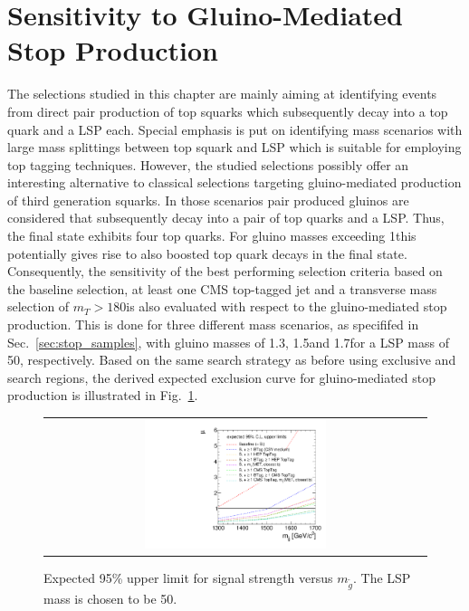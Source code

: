 \section{Sensitivity to Gluino-Mediated Stop Production}
\label{sec:stop_gluinos}
The selections studied in this chapter are mainly aiming at identifying events from direct pair production of top squarks which subsequently decay into a top quark and a LSP each. Special emphasis is put on identifying mass scenarios with large mass splittings between top squark and LSP which is suitable for employing top tagging techniques. However, the studied selections possibly offer an interesting alternative to classical selections targeting gluino-mediated production of third generation squarks. In those scenarios pair produced gluinos are considered that subsequently decay into a pair of top quarks and a LSP. Thus, the final state exhibits four top quarks. For gluino masses exceeding 1\tev this potentially gives rise to also boosted top quark decays in the final state. Consequently, the sensitivity of the best performing selection criteria based on the baseline selection, at least one CMS top-tagged jet and a transverse mass selection of $m_T > 180$\gev is also evaluated with respect to the gluino-mediated stop production. This is done for three different mass scenarios, as specififed in Sec.~\ref{sec:stop_samples}, with gluino masses of 1.3\tev, 1.5\tev and 1.7\tev for a LSP mass of 50\gev, respectively. Based on the same search strategy as before using exclusive \HT and \met search regions, the derived expected exclusion curve for gluino-mediated stop production is illustrated in Fig.~\ref{fig:stop_gluino_mediated_limit}. \\
\begin{figure}[!h]
  \centering
  \begin{tabular}{c}
                \includegraphics[width=0.49\textwidth]{figures/limitplot4BinSel_T1tttt.pdf} 
  \end{tabular}
  \caption{Expected 95\% upper limit for signal strength versus $m_{\tilde{g}}$. The LSP mass is chosen to be 50\gev.}
  \label{fig:stop_gluino_mediated_limit}
\end{figure}

